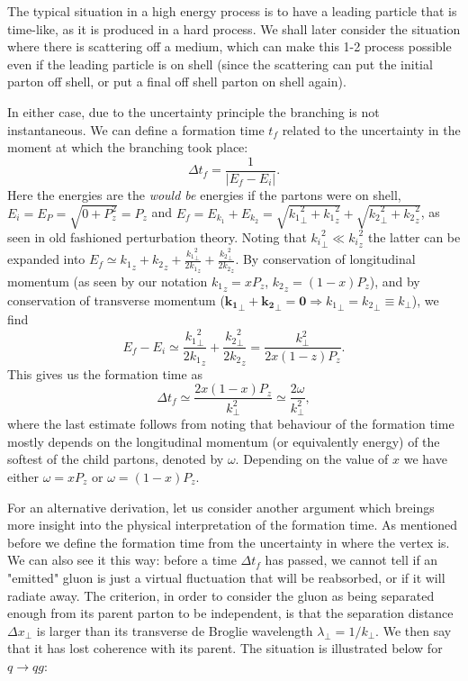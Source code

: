 \documentclass[a4paper,12pt]{article}
\numberwithin{equation}{section}
\begin{document}
The typical situation in a high energy process is to have a leading particle that is time-like, as it is produced in a hard process. We shall later consider the situation where there is scattering off a medium, which can make this 1-2 process possible even if the leading particle is on shell (since the scattering can put the initial parton off shell, or put a final off shell parton on shell again).

In either case, due to the uncertainty principle the branching is not instantaneous. We can define a formation time $t_f$ related to the uncertainty in the moment at which the branching took place:
\begin{equation}
\Delta t_f=\frac{1}{|E_f-E_i|}.
\end{equation}
Here the energies are the \emph{would be} energies if the partons were on shell, $E_i=E_P=\sqrt{0+P_z^2}=P_z$ and $E_f=E_{k_1}+E_{k_2}=\sqrt{{k_1}_\perp^2 + {k_1}_z^2}+\sqrt{{k_2}_\perp^2 + {k_2}_z^2}$, as seen in old fashioned perturbation theory. Noting that ${k_i}_\perp^2\ll {k_i}_z^2$ the latter can be expanded into $E_f \simeq {k_1}_z+{k_2}_z + \frac{{k_1}_\perp^2}{2{k_1}_z}+\frac{{k_2}_\perp^2}{2{k_2}_z}$. By conservation of longitudinal momentum (as seen by our notation ${k_1}_z=xP_z$, ${k_2}_z=(1-x)P_z$), and by conservation of transverse momentum ($\mathbf{k_1}_\perp+\mathbf{k_2}_\perp=\mathbf{0}\Rightarrow {k_1}_\perp={k_2}_\perp \equiv k_\perp$), we find
\begin{equation}
E_f-E_i \simeq \frac{{k_1}_\perp^2}{2{k_1}_z}+\frac{{k_2}_\perp^2}{2{k_2}_z} = \frac{k_\perp^2}{2x(1-z)P_z}.
\end{equation}
This gives us the formation time as
\begin{equation}\label{formation}
\Delta t_f \simeq \frac{2x(1-x)P_z}{k_\perp^2}\simeq \frac{2 \omega}{k_\perp^2},
\end{equation}
where the last estimate follows from noting that behaviour of the formation time mostly depends on the longitudinal momentum (or equivalently energy) of the softest of the child partons, denoted by $\omega$. Depending on the value of $x$ we have either $\omega=xP_z$ or $\omega=(1-x)P_z$.%

For an alternative derivation, let us consider another argument which breings more insight into the physical interpretation of the formation time. As mentioned before we define the formation time from the uncertainty in where the vertex is. We can also see it this way: before a time $\Delta t_f$ has passed, we cannot tell if an "emitted" gluon is just a virtual fluctuation that will be reabsorbed, or if it will radiate away. The criterion, in order to consider the gluon as being separated enough from its parent parton to be independent, is that the separation distance $\Delta x_\perp$ is larger than its transverse de Broglie wavelength $\lambda_\perp=1/k_\perp$. We then say that it has lost coherence with its parent. The situation is illustrated below for $q\rightarrow qg$: %
\end{document}
